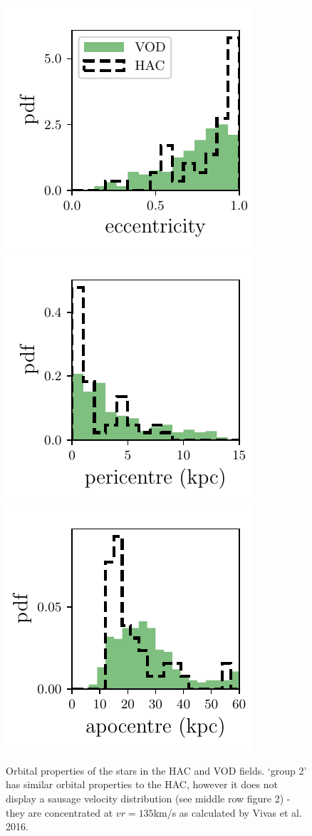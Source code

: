 \documentclass[fleqn,usenatbib]{mnras}
\begin{document}
\begin{figure}
              \includegraphics[scale=0.472]{eccentricities.pdf} 
    \includegraphics[scale=0.472]{pericentres.pdf} 
                          \includegraphics[scale=0.472]{apocentres.pdf} 
  \caption{ Orbital properties of the stars in the HAC and VOD fields. `group 2' has similar orbital properties to the HAC, however it does not display a sausage velocity distribution (see middle row figure 2) - they are concentrated at $vr =  135 $km/s as calculated by Vivas et al. 2016. }
    \label{fig:orbits}
    
    \end{figure}
\end{document}
